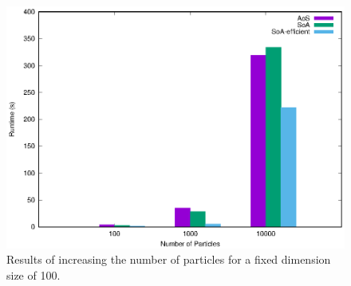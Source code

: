 \begin{figure}
  \includegraphics[width=\columnwidth]{../img/output/N}
  \caption{Results of increasing the number of particles for a fixed dimension
    size of 100.}
  \label{fig:exp-N}
\end{figure}

